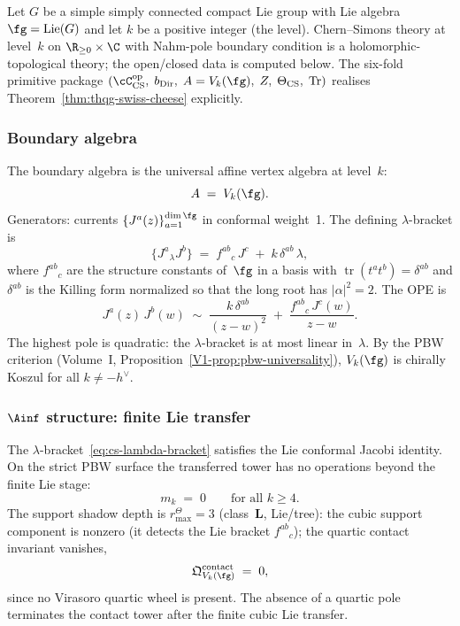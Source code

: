 Let $G$ be a simple simply connected compact Lie group with Lie algebra $\fg = \operatorname{Lie}(G)$ and let $k$ be a positive integer (the level). Chern--Simons theory at level~$k$ on $\R_{\ge 0} \times \C$ with Nahm-pole boundary condition is a holomorphic-topological theory; the open/closed data is computed below. The six-fold primitive package $(\cC_{\mathrm{CS}}^{\mathrm{op}},\; b_{\mathrm{Dir}},\; A = V_k(\fg),\; Z,\; \Theta_{\mathrm{CS}},\; \operatorname{Tr})$ realises Theorem~\ref{thm:thqg-swiss-cheese} explicitly.

\subsubsection*{Boundary algebra}

The boundary algebra is the universal affine vertex algebra at
level~$k$:
\begin{equation}\label{eq:cs-boundary-algebra}
A \;=\; V_k(\fg).
\end{equation}
Generators: currents $\{J^a(z)\}_{a=1}^{\dim\fg}$ in conformal
weight~1.
The defining $\lambda$-bracket is
\begin{equation}\label{eq:cs-lambda-bracket}
\{J^a{}_\lambda J^b\}
\;=\;
f^{ab}{}_c\, J^c \;+\; k\,\delta^{ab}\,\lambda,
\end{equation}
where $f^{ab}{}_c$ are the structure constants of~$\fg$ in a basis
with $\operatorname{tr}(t^a t^b) = \delta^{ab}$ and $\delta^{ab}$
is the Killing form normalized so that the long root has
$|\alpha|^2 = 2$.
The OPE is
\[
J^a(z)\, J^b(w)
\;\sim\;
\frac{k\,\delta^{ab}}{(z-w)^2}
\;+\;
\frac{f^{ab}{}_c\, J^c(w)}{z-w}.
\]
The highest pole is quadratic:
the $\lambda$-bracket is at most linear in~$\lambda$.
By the PBW criterion (Volume~I, Proposition~\ref*{V1-prop:pbw-universality}),
$V_k(\fg)$ is chirally Koszul for all $k \ne -h^\vee$.

\subsubsection*{$\Ainf$ structure: finite Lie transfer}

The $\lambda$-bracket~\eqref{eq:cs-lambda-bracket} satisfies the Lie
conformal Jacobi identity. On the strict PBW surface the transferred
tower has no operations beyond the finite Lie stage:
\begin{equation}\label{eq:cs-mk-vanish}
m_k \;=\; 0
\qquad
\text{for all } k \ge 4.
\end{equation}
The support shadow depth is \(r^\Theta_{\max}=3\)
(class~$\mathbf{L}$, Lie/tree): the cubic support component is nonzero
(it detects the Lie bracket $f^{ab}{}_c$); the quartic contact invariant vanishes,
\begin{equation}\label{eq:cs-quartic-vanishes}
\mathfrak{Q}^{\mathrm{contact}}_{V_k(\fg)} \;=\; 0,
\end{equation}
since no Virasoro quartic wheel is present. The absence of a quartic
pole terminates the contact tower after the finite cubic Lie transfer.

